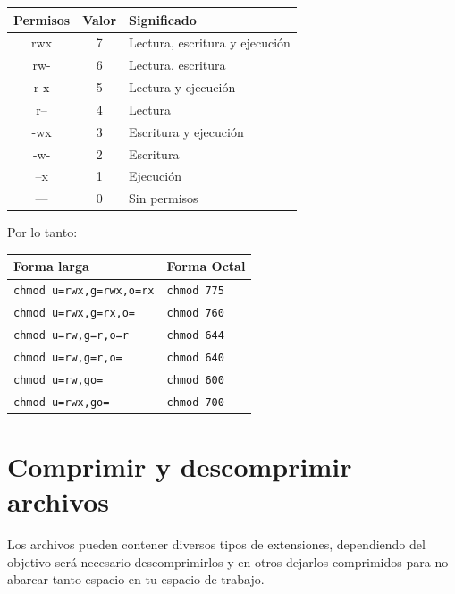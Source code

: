 \documentclass[
  spanish,
  12pt,
  letterpaper,
  DIV=11,
  numbers=noendperiod]{scrreprt}
\newcounter{none} %
\begin{document}
{\def\LTcaptype{none} %
\begin{longtable}[]{@{}ccl@{}}
\toprule\noalign{}
Permisos & Valor & Significado \\
\midrule\noalign{}
\endhead
\bottomrule\noalign{}
\endlastfoot
rwx & 7 & Lectura, escritura y ejecución \\
rw- & 6 & Lectura, escritura \\
r-x & 5 & Lectura y ejecución \\
r-- & 4 & Lectura \\
-wx & 3 & Escritura y ejecución \\
-w- & 2 & Escritura \\
--x & 1 & Ejecución \\
--- & 0 & Sin permisos \\
\end{longtable}
}

Por lo tanto:

{\def\LTcaptype{none} %
\begin{longtable}[]{@{}ll@{}}
\toprule\noalign{}
Forma larga & Forma Octal \\
\midrule\noalign{}
\endhead
\bottomrule\noalign{}
\endlastfoot
\texttt{chmod\ u=rwx,g=rwx,o=rx} & \texttt{chmod\ 775} \\
\texttt{chmod\ u=rwx,g=rx,o=} & \texttt{chmod\ 760} \\
\texttt{chmod\ u=rw,g=r,o=r} & \texttt{chmod\ 644} \\
\texttt{chmod\ u=rw,g=r,o=} & \texttt{chmod\ 640} \\
\texttt{chmod\ u=rw,go=} & \texttt{chmod\ 600} \\
\texttt{chmod\ u=rwx,go=} & \texttt{chmod\ 700} \\
\end{longtable}
}

\section{Comprimir y descomprimir
archivos}\label{comprimir-y-descomprimir-archivos}

Los archivos pueden contener diversos tipos de extensiones, dependiendo
del objetivo será necesario descomprimirlos y en otros dejarlos
comprimidos para no abarcar tanto espacio en tu espacio de trabajo.~
\end{document}

